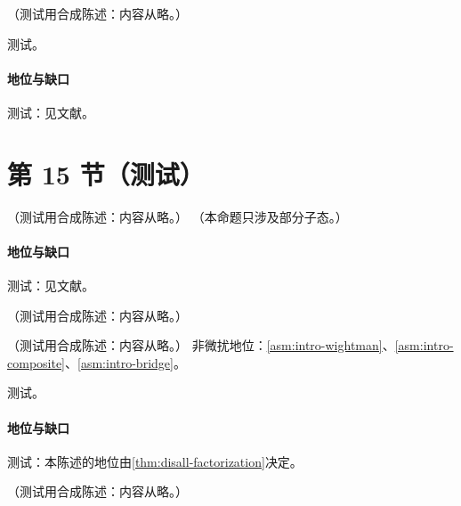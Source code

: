 \begin{proposition}\label{prop:front-lightray-ope}
（测试用合成陈述：内容从略。）
\end{proposition}
\begin{proofsketch}测试。\end{proofsketch}
\paragraph{地位与缺口}测试：见文献。

\section{第 15 节（测试）}\label{sec:front-qed}

\begin{proposition}\label{prop:front-nrqcd-ir}
（测试用合成陈述：内容从略。）
（本命题只涉及部分子态。）
\end{proposition}
\paragraph{地位与缺口}测试：见文献。

\begin{remark}[唯象张力与替代方案]\label{rem:front-quarkonium-alternatives}
（测试用合成陈述：内容从略。）
\end{remark}

\begin{theorem}\label{thm:front-luxqed}
（测试用合成陈述：内容从略。）
非微扰地位：\cref{asm:intro-wightman}、\cref{asm:intro-composite}、\cref{asm:intro-bridge}。
\end{theorem}
\begin{proofsketch}测试。\end{proofsketch}
\paragraph{地位与缺口}测试：本陈述的地位由\cref{thm:disall-factorization}决定。

\begin{example}[点状靶极限]\label{ex:front-luxqed-pointlike}
（测试用合成陈述：内容从略。）
\end{example}

